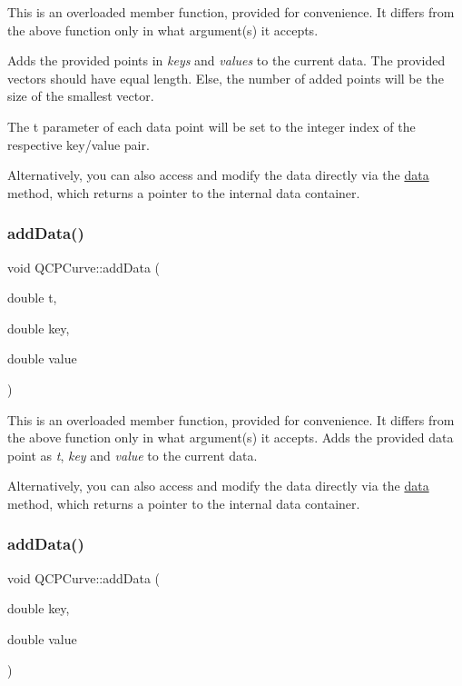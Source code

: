 This is an overloaded member function, provided for convenience. It differs from the above function only in what argument(s) it accepts.

Adds the provided points in {\itshape keys} and {\itshape values} to the current data. The provided vectors should have equal length. Else, the number of added points will be the size of the smallest vector.

The t parameter of each data point will be set to the integer index of the respective key/value pair.

Alternatively, you can also access and modify the data directly via the \hyperlink{class_q_c_p_curve_a761492fd00b1ab7cb18ce23c118c6c60}{data} method, which returns a pointer to the internal data container. \mbox{\label{class_q_c_p_curve_a13398b236f6926014e404eeb5b9f415c}} 
\subsubsection{\texorpdfstring{add\+Data()}{addData()}\hspace{0.1cm}{\footnotesize\ttfamily [3/4]}}
{\footnotesize\ttfamily void Q\+C\+P\+Curve\+::add\+Data (\begin{DoxyParamCaption}\item[{double}]{t,  }\item[{double}]{key,  }\item[{double}]{value }\end{DoxyParamCaption})}

This is an overloaded member function, provided for convenience. It differs from the above function only in what argument(s) it accepts. Adds the provided data point as {\itshape t}, {\itshape key} and {\itshape value} to the current data.

Alternatively, you can also access and modify the data directly via the \hyperlink{class_q_c_p_curve_a761492fd00b1ab7cb18ce23c118c6c60}{data} method, which returns a pointer to the internal data container. \mbox{\label{class_q_c_p_curve_ada4762e793cd5707b33f35b8a4b0f8fb}} 
\subsubsection{\texorpdfstring{add\+Data()}{addData()}\hspace{0.1cm}{\footnotesize\ttfamily [4/4]}}
{\footnotesize\ttfamily void Q\+C\+P\+Curve\+::add\+Data (\begin{DoxyParamCaption}\item[{double}]{key,  }\item[{double}]{value }\end{DoxyParamCaption})}

